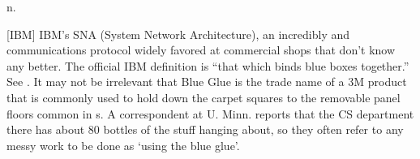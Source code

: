  n.

[IBM] IBM's SNA (System Network Architecture), an incredibly 
and  communications protocol widely favored at commercial
shops that don't know any better. The official IBM definition is ``that which
binds blue boxes together.'' See . It may not be
irrelevant that Blue Glue is the trade name of a 3M product that is commonly
used to hold down the carpet squares to the removable panel floors common in
s. A correspondent at U. Minn. reports that the CS
department there has about 80 bottles of the stuff hanging about, so they often
refer to any messy work to be done as `using the blue glue'.

